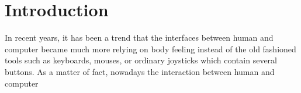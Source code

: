 \chapter{Introduction}
\label{c:intro}


In recent years, it has been a trend that the interfaces between human and computer became much more relying on body feeling instead of the old fashioned tools such as keyboards, mouses, or ordinary joysticks which contain several buttons. As a matter of fact, nowadays the interaction between human and computer 


